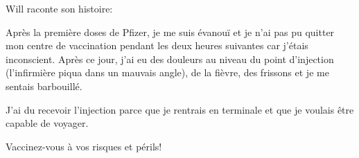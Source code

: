 Will raconte son histoire:

Après la première doses de Pfizer, je me suis évanouï et je n'ai pas pu quitter
mon centre de vaccination pendant les deux heures suivantes car j'étais
inconscient. Après ce jour, j'ai eu des douleurs au niveau du point d'injection
(l'infirmière piqua dans un mauvais angle), de la fièvre, des frissons et je me
sentais barbouillé.

J'ai du recevoir l'injection parce que je rentrais en terminale et que je
voulais être capable de voyager.

Vaccinez-vous à vos risques et périls!

